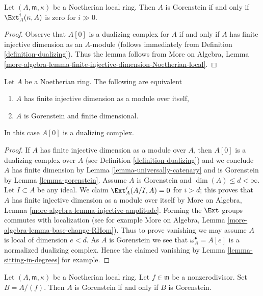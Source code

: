\begin{lemma}
\label{lemma-gorenstein-ext}
Let $(A, \mathfrak m, \kappa)$ be a Noetherian local ring.
Then $A$ is Gorenstein if and only if $\Ext^i_A(\kappa, A)$
is zero for $i \gg 0$.
\end{lemma}

\begin{proof}
Observe that $A[0]$ is a dualizing complex for $A$ if and only
if $A$ has finite injective dimension as an $A$-module
(follows immediately from Definition \ref{definition-dualizing}).
Thus the lemma follows from More on Algebra, Lemma
\ref{more-algebra-lemma-finite-injective-dimension-Noetherian-local}.
\end{proof}

\begin{lemma}
\label{lemma-characterize-gorenstein}
Let $A$ be a Noetherian ring. The following are equivalent
\begin{enumerate}
\item $A$ has finite injective dimension as a module over itself,
\item $A$ is Gorenstein and finite dimensional.
\end{enumerate}
In this case $A[0]$ is a dualizing complex.
\end{lemma}

\begin{proof}
If $A$ has finite injective dimension as a module over $A$, then
$A[0]$ is a dualizing complex over $A$
(see Definition \ref{definition-dualizing})
and we conclude $A$ has finite dimension by
Lemma \ref{lemma-universally-catenary} and
is Gorenstein by Lemma \ref{lemma-gorenstein}.
Assume $A$ is Gorenstein and $\dim(A) \leq d < \infty$.
Let $I \subset A$ be any ideal. We claim $\Ext^i_A(A/I, A) = 0$
for $i > d$; this proves that $A$ has finite injective
dimension as a module over itself by
More on Algebra, Lemma \ref{more-algebra-lemma-injective-amplitude}.
Forming the $\Ext$ groups commutes with localization (see for example
More on Algebra, Lemma \ref{more-algebra-lemma-base-change-RHom}).
Thus to prove vanishing we may assume $A$ is local of
dimension $e < d$. As $A$ is Gorenstein we see that
$\omega_A^\bullet = A[e]$ is a normalized dualizing complex.
Hence the claimed vanishing by Lemma \ref{lemma-sitting-in-degrees}
for example.
\end{proof}

\begin{lemma}
\label{lemma-gorenstein-divide-by-nonzerodivisor}
Let $(A, \mathfrak m, \kappa)$
be a Noetherian local ring. Let $f \in \mathfrak m$ be a
nonzerodivisor. Set $B = A/(f)$. Then $A$ is Gorenstein if and
only if $B$ is Gorenstein.
\end{lemma}

